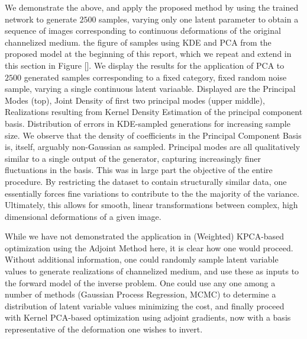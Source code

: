 \documentclass{article}
\begin{document}
	We demonstrate the above, and apply the proposed method by using the trained network to generate $2500$ samples, varying only one latent parameter to obtain a sequence of images corresponding to continuous deformations of the original channelized medium.   the figure of samples using KDE and PCA from the proposed model at the beginning of this report, which we repeat and extend in this section in Figure [\label{GenPCA2}].  We display the results for the application of PCA to $2500$ generated samples corresponding to a fixed category, fixed random noise sample, varying a single continuous latent variaable. Displayed are the Principal Modes (top), Joint Density of first two principal modes (upper middle), Realizations resulting from Kernel Density Estimation of the principal component basis.  Distribution of errors in KDE-sampled generations for increasing sample size.  We observe that the density of coefficients in the Principal Component Basis is, itself, arguably non-Gaussian as sampled.  Principal modes are all qualitatively similar to a single output of the generator, capturing increasingly finer fluctuations in the basis. This was in large part the objective of the entire procedure.  By restricting the dataset to contain structurally similar data, one essentially forces fine variations to contribute to the the majority of the variance.  Ultimately, this allows for smooth, linear transformations between complex, high dimensional deformations of a given image.
    
    While we have not demonstrated the application in (Weighted) KPCA-based optimization using the Adjoint Method here, it is clear how one would proceed.  Without additional information, one could randomly sample latent variable values to generate realizations of channelized medium, and use these as inputs to the forward model of the inverse problem. One could use any one among a number of methods (Gaussian Process Regression, MCMC) to determine a distribution of latent variable values minimizing the cost, and finally proceed with Kernel PCA-based optimization using adjoint gradients, now with a basis representative of the deformation one wishes to invert.
    
\end{document}
